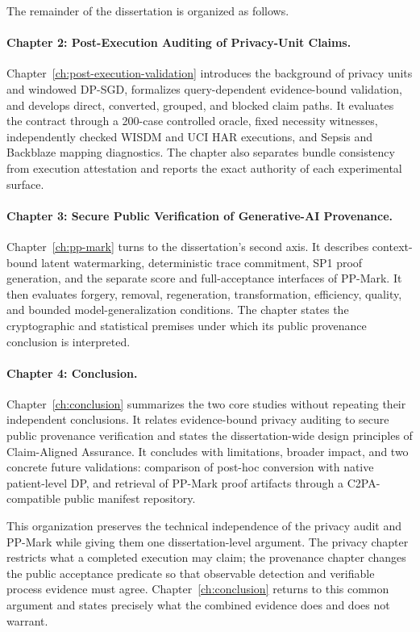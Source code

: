 The remainder of the dissertation is organized as follows.

\paragraph{Chapter 2: Post-Execution Auditing of Privacy-Unit Claims.}
Chapter~\ref{ch:post-execution-validation} introduces the background of privacy
units and windowed DP-SGD, formalizes query-dependent evidence-bound validation,
and develops direct, converted, grouped, and blocked claim paths.  It evaluates
the contract through a 200-case controlled oracle, fixed necessity witnesses,
independently checked WISDM and UCI HAR executions, and Sepsis and Backblaze
mapping diagnostics.  The chapter also separates bundle consistency from
execution attestation and reports the exact authority of each experimental
surface.

\paragraph{Chapter 3: Secure Public Verification of Generative-AI Provenance.}
Chapter~\ref{ch:pp-mark} turns to the dissertation's second axis.  It describes
context-bound latent watermarking, deterministic trace commitment, SP1 proof
generation, and the separate score and full-acceptance interfaces of PP-Mark.  It
then evaluates forgery, removal, regeneration, transformation, efficiency,
quality, and bounded model-generalization conditions.  The chapter states the
cryptographic and statistical premises under which its public provenance
conclusion is interpreted.

\paragraph{Chapter 4: Conclusion.}
Chapter~\ref{ch:conclusion} summarizes the two core studies without repeating
their independent conclusions.  It relates evidence-bound privacy auditing to
secure public provenance verification and states the dissertation-wide design
principles of Claim-Aligned Assurance.  It concludes with limitations, broader
impact, and two concrete future validations: comparison of post-hoc conversion
with native patient-level DP, and retrieval of PP-Mark proof artifacts through a
C2PA-compatible public manifest repository.

This organization preserves the technical independence of the privacy audit and
PP-Mark while giving them one dissertation-level argument.  The privacy chapter
restricts what a completed execution may claim; the provenance chapter changes the
public acceptance predicate so that observable detection and verifiable process
evidence must agree.  Chapter~\ref{ch:conclusion} returns to this common argument
and states precisely what the combined evidence does and does not warrant.
